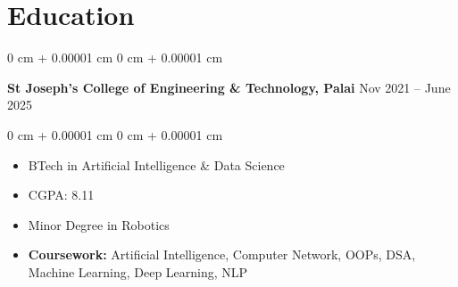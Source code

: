 \documentclass[10pt, letterpaper]{article}
\newenvironment{highlights}{
    \begin{itemize}[
        topsep=0.10 cm,
        parsep=0.10 cm,
        partopsep=0pt,
        itemsep=0pt,
        leftmargin=0 cm + 10pt
    ]
}{
    \end{itemize}
} %
\newenvironment{highlightsforbulletentries}{
    \begin{itemize}[
        topsep=0.10 cm,
        parsep=0.10 cm,
        partopsep=0pt,
        itemsep=0pt,
        leftmargin=10pt
    ]
}{
    \end{itemize}
} %
\newenvironment{onecolentry}{
    \begin{adjustwidth}{
        0 cm + 0.00001 cm
    }{
        0 cm + 0.00001 cm
    }
}{
    \end{adjustwidth}
} %
\newenvironment{twocolentry}[2][]{
    \onecolentry
    \def\secondColumn{#2}
    \setcolumnwidth{\fill, 4.5 cm}
    \begin{paracol}{2}
}{
    \switchcolumn \raggedleft \secondColumn
    \end{paracol}
    \endonecolentry
} %
\begin{document}






\section{Education}

\begin{twocolentry}{
		Nov 2021 – June 2025
	}
	\textbf{St Joseph's College of Engineering \& Technology, Palai}\end{twocolentry}

\vspace{0.10 cm}
\begin{onecolentry}
	\begin{highlights}
		\item BTech in Artificial Intelligence \& Data Science
		\item CGPA: 8.11 %
		\item Minor Degree in Robotics
		\item \textbf{Coursework:} Artificial Intelligence, Computer Network, OOPs, DSA, Machine Learning, Deep Learning, NLP
	\end{highlights}
\end{onecolentry}


\end{document}
